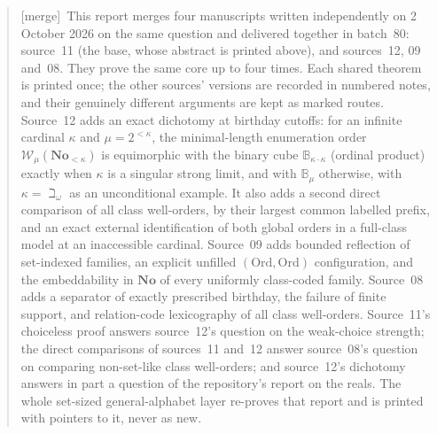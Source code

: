 \documentclass[11pt]{article}
\theoremstyle{definition}
\theoremstyle{remark}
\newcommand{\No}{\mathbf{No}}
\newcommand{\Ord}{\mathrm{Ord}}
\newcommand{\WO}{\mathcal W}
\newcommand{\B}{\mathbb B}
\newcommand{\merge}{\textsf{[merge]}}
\begin{document}
\begin{abstract}
\merge\ This report merges four manuscripts written independently on
2 October 2026 on the same question and delivered together in batch~80:
source~11 (the base, whose abstract is printed above), and sources~12, 09
and~08. They prove the same core up to four times. Each shared theorem is
printed once; the other sources' versions are recorded in numbered notes,
and their genuinely different arguments are kept as marked routes. Source~12
adds an exact dichotomy at birthday cutoffs: for an infinite cardinal
$\kappa$ and $\mu=2^{<\kappa}$, the minimal-length enumeration order
$\WO_\mu(\No_{<\kappa})$ is equimorphic with the binary cube
$\B_{\kappa\cdot\kappa}$ (ordinal product) exactly when $\kappa$ is a singular
strong limit, and with $\B_\mu$ otherwise, with $\kappa=\beth_\omega$ as an
unconditional example. It also adds a second direct comparison of all class
well-orders, by their largest common labelled prefix, and an exact external
identification of both global orders in a full-class model at an inaccessible
cardinal. Source~09 adds bounded reflection of set-indexed families, an
explicit unfilled $(\Ord,\Ord)$ configuration, and the embeddability in $\No$
of every uniformly class-coded family. Source~08 adds a separator of exactly
prescribed birthday, the failure of finite support, and relation-code
lexicography of all class well-orders. Source~11's choiceless proof answers
source~12's question on the weak-choice strength; the direct comparisons of
sources~11 and~12 answer source~08's question on comparing non-set-like class
well-orders; and source~12's dichotomy answers in part a question of the
repository's report on the reals. The whole set-sized general-alphabet layer
re-proves that report and is printed with pointers to it, never as new.
\end{abstract}
\end{document}
